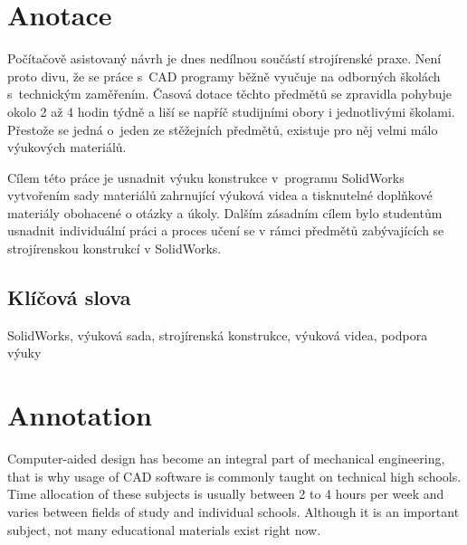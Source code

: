 \documentclass{template/socthesis}
\author{Petr Štourač}
\begin{document}

\maketitle




\pagestyle{empty}

\section*{Anotace}
Počítačově asistovaný návrh je dnes nedílnou součástí strojírenské praxe.
Není proto divu, že se práce s~CAD programy běžně vyučuje na odborných školách s~technickým zaměřením.
Časová dotace těchto předmětů se zpravidla pohybuje okolo 2 až 4 hodin týdně a liší se napříč studijními obory i jednotlivými školami.
Přestože se jedná o~jeden ze stěžejních předmětů, existuje pro něj velmi málo výukových materiálů.

Cílem této práce je usnadnit výuku konstrukce v~programu SolidWorks vytvořením sady materiálů zahrnující výuková videa a tisknutelné doplňkové materiály obohacené o otázky a úkoly.
Dalším zásadním cílem bylo studentům usnadnit individuální práci a proces učení se v rámci předmětů zabývajících se strojírenskou konstrukcí v SolidWorks. 

\subsection*{Klíčová slova}
SolidWorks, výuková sada, strojírenská konstrukce, výuková videa, podpora výuky

\newpage

\section*{Annotation}
Computer-aided design has become an integral part of mechanical engineering, that is why usage of CAD software is commonly taught on technical high schools.
Time allocation of these subjects is usually between 2 to 4 hours per week and varies between fields of study and individual schools. 
Although it is an important subject, not many educational materials exist right now.
\end{document}
